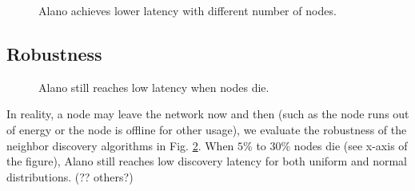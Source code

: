 \begin{figure}[!h]
\centering
{}
\hspace{0.01in}
\caption{Alano achieves lower latency with different number of nodes.}
\label{fig_node}
\end{figure}

\subsection{Robustness}

\begin{figure}[!h]
\centering
{}
\hspace{0.01in}
\caption{Alano still reaches low latency when nodes die.}
\label{fig_robust}
\end{figure}

In reality, a node may leave the network now and then (such as the node runs out of energy or the node is offline for other usage), we evaluate the robustness of the neighbor discovery algorithms in Fig. \ref{fig_robust}. When $5\%$ to $30\%$ nodes die (see x-axis of the figure), Alano still reaches low discovery latency for both uniform and normal distributions. (?? others?)

